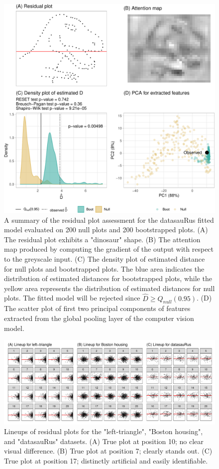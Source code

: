 \documentclass[]{interact}
\theoremstyle{plain}%
\theoremstyle{definition}
\theoremstyle{remark}
\begin{document}
\begin{figure}[!h]

{\centering \includegraphics[width=0.8\linewidth]{paper_files/figure-latex/dino-check-1} 

}

\caption{A summary of the residual plot assessment for the datasauRus fitted model evaluated on 200 null plots and 200 bootstrapped plots. (A) The residual plot exhibits a "dinosaur" shape. (B) The attention map produced by computing the gradient of the output with respect to the greyscale input.  (C) The density plot of estimated distance for null plots and bootstrapped plots. The blue area indicates the distribution of estimated distances for bootstrapped plots, while the yellow area represents the distribution of estimated distances for null plots. The fitted model will be rejected since $\hat{D} \geq Q_{null}(0.95)$. (D) The scatter plot of first two principal components of features extracted from the global pooling layer of the computer vision model.}\label{fig:dino-check}
\end{figure}

\begin{figure}[!h]

{\centering \includegraphics[width=1\linewidth]{paper_files/figure-latex/lineup-1} 

}

\caption{Lineups of residual plots for the "left-triangle", "Boston housing", and "datasauRus" datasets. (A) True plot at position 10; no clear visual difference. (B) True plot at position 7; clearly stands out. (C) True plot at position 17; distinctly artificial and easily identifiable.}\label{fig:lineup}
\end{figure}
\end{document}
